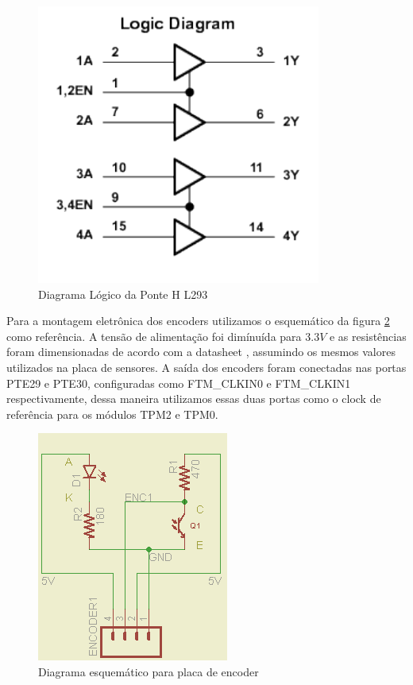 \documentclass{article}
\begin{document}
\begin{figure}[H]
	\centering
	\includegraphics[width=0.6\linewidth]{logicPonteH}
	\caption{Diagrama Lógico da Ponte H L293 \cite{bb:l293}}
	\label{fig:logicPonteH}
\end{figure}

Para a montagem eletrônica dos encoders utilizamos o esquemático da figura \ref{fig:encoder1} como referência. A tensão de alimentação foi dimínuída para $3.3V$ e as resistências foram dimensionadas de acordo com a datasheet \cite{bb:photo}, assumindo os mesmos valores utilizados na placa de sensores. A saída dos encoders foram conectadas nas portas PTE29 e PTE30, configuradas como FTM\_CLKIN0 e FTM\_CLKIN1 respectivamente, dessa maneira utilizamos essas duas portas como o clock de referência para os módulos TPM2 e TPM0.

\begin{figure}[H]
	\centering
	\includegraphics[width=0.6\linewidth]{encoder1}
	\caption{Diagrama esquemático para placa de encoder}
	\label{fig:encoder1}
\end{figure}
\end{document}
